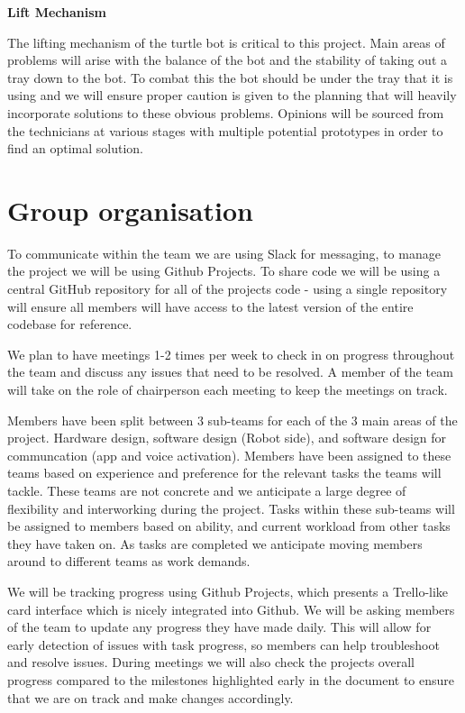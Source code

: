 \documentclass{article}
\begin{document}
\textbf{Lift Mechanism}

The lifting mechanism of the turtle bot is critical to this project. Main areas of problems will arise with the balance of the bot and the stability of taking out a tray down to the bot. To combat this the bot should be under the tray that it is using and we will ensure proper caution is given to the planning that will heavily incorporate solutions to these obvious problems. Opinions will be sourced from the technicians at various stages with multiple potential prototypes in order to find an optimal solution.

\section{Group organisation}

To communicate within the team we are using Slack for messaging, to manage the project we will be using Github Projects. To share code we will be using a central GitHub repository for all of the projects code - using a single repository will ensure all members will have access to the latest version of the entire codebase for reference.

We plan to have meetings 1-2 times per week to check in on progress throughout the team and discuss any issues that need to be resolved. A member of the team will take on the role of chairperson each meeting to keep the meetings on track. 

Members have been split between 3 sub-teams for each of the 3 main areas of the project. Hardware design, software design (Robot side), and software design for communcation (app and voice activation). Members have been assigned to these teams based on experience and preference for the relevant tasks the teams will tackle. These teams are not concrete and we anticipate a large degree of flexibility and interworking during the project. Tasks within these sub-teams will be assigned to members based on ability, and current workload from other tasks they have taken on. As tasks are completed we anticipate moving members around to different teams as work demands.

We will be tracking progress using Github Projects, which presents a Trello-like card interface which is nicely integrated into Github. We will be asking members of the team to update any progress they have made daily. This will allow for early detection of issues with task progress, so members can help troubleshoot and resolve issues. During meetings we will also check the projects overall progress compared to the milestones highlighted early in the document to ensure that we are on track and make changes accordingly.



\end{document}
